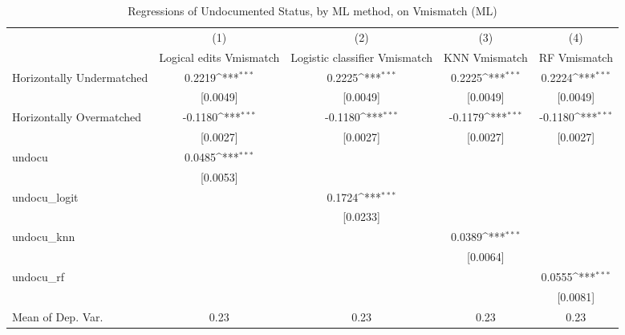 \begin{table}[htbp]\centering
\def\sym#1{\ifmmode^{#1}\else\(^{#1}\)\fi}
\caption{Regressions of Undocumented Status, by ML method, on Vmismatch (ML)}
\begin{tabular}{l*{4}{c}}
\toprule
                    &\multicolumn{1}{c}{(1)}         &\multicolumn{1}{c}{(2)}         &\multicolumn{1}{c}{(3)}         &\multicolumn{1}{c}{(4)}         \\
                    &Logical edits Vmismatch         &Logistic classifier Vmismatch         &KNN Vmismatch         &RF Vmismatch         \\
\midrule
Horizontally Undermatched&      0.2219\sym{***}&      0.2225\sym{***}&      0.2225\sym{***}&      0.2224\sym{***}\\
                    &    [0.0049]         &    [0.0049]         &    [0.0049]         &    [0.0049]         \\
\addlinespace
Horizontally Overmatched&     -0.1180\sym{***}&     -0.1180\sym{***}&     -0.1179\sym{***}&     -0.1180\sym{***}\\
                    &    [0.0027]         &    [0.0027]         &    [0.0027]         &    [0.0027]         \\
\addlinespace
undocu              &      0.0485\sym{***}&                     &                     &                     \\
                    &    [0.0053]         &                     &                     &                     \\
\addlinespace
undocu\_logit        &                     &      0.1724\sym{***}&                     &                     \\
                    &                     &    [0.0233]         &                     &                     \\
\addlinespace
undocu\_knn          &                     &                     &      0.0389\sym{***}&                     \\
                    &                     &                     &    [0.0064]         &                     \\
\addlinespace
undocu\_rf           &                     &                     &                     &      0.0555\sym{***}\\
                    &                     &                     &                     &    [0.0081]         \\
\midrule
Mean of Dep. Var.   &        0.23         &        0.23         &        0.23         &        0.23         \\

\end{tabular}
\end{table}
